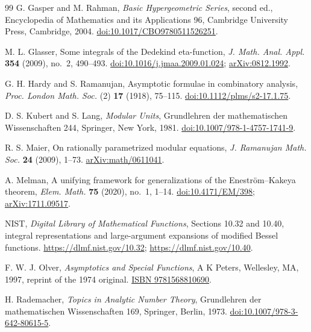 \documentclass[11pt]{amsart}
\theoremstyle{definition}
\theoremstyle{remark}
\numberwithin{equation}{section}
\begin{document}
\begin{thebibliography}{99}
G. Gasper and M. Rahman, \emph{Basic Hypergeometric Series}, second ed., Encyclopedia of Mathematics and its Applications 96, Cambridge University Press, Cambridge, 2004.
\href{https://doi.org/10.1017/CBO9780511526251}{doi:10.1017/CBO9780511526251}.

M. L. Glasser, Some integrals of the Dedekind eta-function, \emph{J. Math. Anal. Appl.} \textbf{354} (2009), no.~2, 490--493.
\href{https://doi.org/10.1016/j.jmaa.2009.01.024}{doi:10.1016/j.jmaa.2009.01.024};
\href{https://arxiv.org/abs/0812.1992}{arXiv:0812.1992}.

G. H. Hardy and S. Ramanujan, Asymptotic formulae in combinatory analysis, \emph{Proc. London Math. Soc.} (2) \textbf{17} (1918), 75--115.
\href{https://doi.org/10.1112/plms/s2-17.1.75}{doi:10.1112/plms/s2-17.1.75}.

D. S. Kubert and S. Lang, \emph{Modular Units}, Grundlehren der mathematischen Wissenschaften 244, Springer, New York, 1981.
\href{https://doi.org/10.1007/978-1-4757-1741-9}{doi:10.1007/978-1-4757-1741-9}.

R. S. Maier, On rationally parametrized modular equations, \emph{J. Ramanujan Math. Soc.} \textbf{24} (2009), 1--73.
\href{https://arxiv.org/abs/math/0611041}{arXiv:math/0611041}.

A. Melman, A unifying framework for generalizations of the Enestr\"om--Kakeya theorem, \emph{Elem. Math.} \textbf{75} (2020), no.~1, 1--14.
\href{https://doi.org/10.4171/EM/398}{doi:10.4171/EM/398};
\href{https://arxiv.org/abs/1711.09517}{arXiv:1711.09517}.

NIST, \emph{Digital Library of Mathematical Functions}, Sections 10.32 and 10.40, integral representations and large-argument expansions of modified Bessel functions.
\url{https://dlmf.nist.gov/10.32}; \url{https://dlmf.nist.gov/10.40}.

F. W. J. Olver, \emph{Asymptotics and Special Functions}, A K Peters, Wellesley, MA, 1997, reprint of the 1974 original.
\href{https://www.routledge.com/Asymptotics-and-Special-Functions/Olver/p/book/9781568810690}{ISBN 9781568810690}.

H. Rademacher, \emph{Topics in Analytic Number Theory}, Grundlehren der mathematischen Wissenschaften 169, Springer, Berlin, 1973.
\href{https://doi.org/10.1007/978-3-642-80615-5}{doi:10.1007/978-3-642-80615-5}.


\end{thebibliography}
\end{document}
